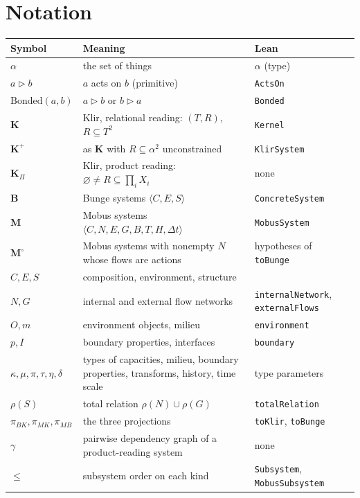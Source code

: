 \documentclass[11pt]{article}
\theoremstyle{definition}
\theoremstyle{remark}
\newcommand{\K}{\mathbf{K}}
\newcommand{\Kp}{\mathbf{K}^{+}}
\newcommand{\KP}{\mathbf{K}_{\Pi}}
\newcommand{\B}{\mathbf{B}}
\newcommand{\M}{\mathbf{M}}
\newcommand{\Mo}{\mathbf{M}^{\circ}}
\newcommand{\acts}{\mathrel{\triangleright}}
\newcommand{\Bonded}{\mathrm{Bonded}}
\newcommand{\lean}[1]{\texttt{#1}}
\newcommand{\pBK}{\pi_{BK}}
\newcommand{\pMB}{\pi_{MB}}
\newcommand{\pMK}{\pi_{MK}}
\begin{document}
\section*{Notation}
\begin{center}
\renewcommand{\arraystretch}{1.15}
\begin{tabular}{@{}l>{\raggedright\arraybackslash}p{6.6cm}>{\raggedright\arraybackslash}p{4.2cm}@{}}
\toprule
Symbol & Meaning & Lean\\
\midrule
$\alpha$ & the set of things & $\alpha$ (type)\\
$a\acts b$ & $a$ acts on $b$ (primitive) & \lean{ActsOn}\\
$\Bonded(a,b)$ & $a\acts b$ or $b\acts a$ & \lean{Bonded}\\
$\K$ & Klir, relational reading: $(T,R)$, $R\subseteq T^2$ & \lean{Kernel}\\
$\Kp$ & as $\K$ with $R\subseteq\alpha^2$ unconstrained & \lean{KlirSystem}\\
$\KP$ & Klir, product reading: $\varnothing\ne R\subseteq\prod_iX_i$ & none\\
$\B$ & Bunge systems $\langle C,E,S\rangle$ & \lean{ConcreteSystem}\\
$\M$ & Mobus systems $\langle C,N,E,G,B,T,H,\Delta t\rangle$ & \lean{MobusSystem}\\
$\Mo$ & Mobus systems with nonempty $N$ whose flows are actions & hypotheses of \lean{toBunge}\\
$C,E,S$ & composition, environment, structure & \\
$N,G$ & internal and external flow networks & \lean{internalNetwork}, \lean{externalFlows}\\
$O,m$ & environment objects, milieu & \lean{environment}\\
$p,I$ & boundary properties, interfaces & \lean{boundary}\\
$\kappa,\mu,\pi,\tau,\eta,\delta$ & types of capacities, milieu, boundary properties, transforms, history, time scale & type parameters\\
$\rho(S)$ & total relation $\rho(N)\cup\rho(G)$ & \lean{totalRelation}\\
$\pBK,\pMK,\pMB$ & the three projections & \lean{toKlir}, \lean{toBunge}\\
$\gamma$ & pairwise dependency graph of a product-reading system & none\\
$\le$ & subsystem order on each kind & \lean{Subsystem}, \lean{MobusSubsystem}\\
\bottomrule
\end{tabular}
\end{center}
\end{document}

